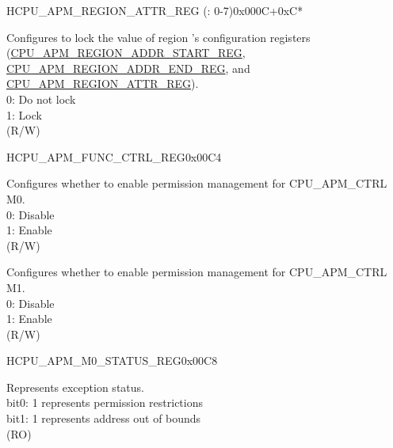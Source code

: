 \begin{register}{H}{CPU\_APM\_REGION\_ATTR\_REG (: 0-7)}{0x000C+0xC*}
\begin{regdesc}
\begin{reglist}
\label{fielddesc:CPUAPMREGIONNLOCK}\item [CPU\_APM\_REGION\regindex{n}\_LOCK] Configures to lock the value of region 's configuration registers (\hyperref[regdesc:CPUAPMREGIONNADDRSTARTREG]{CPU\_APM\_REGION\_ADDR\_START\_REG}, \hyperref[regdesc:CPUAPMREGIONNADDRENDREG]{CPU\_APM\_REGION\_ADDR\_END\_REG}, and \hyperref[regdesc:CPUAPMREGIONNATTRREG]{CPU\_APM\_REGION\_ATTR\_REG}).\\
0: Do not lock \\
1: Lock  \\ (R/W)
\end{reglist}\end{regdesc}
\end{register}


\begin{register}{H}{CPU\_APM\_FUNC\_CTRL\_REG}{0x00C4}\label{regdesc:CPUAPMFUNCCTRLREG}
%
%
%
\regnewline%
\begin{regdesc}\begin{reglist}
\label{fielddesc:CPUAPMM0FUNCEN}\item [CPU\_APM\_M0\_FUNC\_EN] Configures whether to enable permission management for CPU\_APM\_CTRL M0.\\
0: Disable\\
1: Enable\\
(R/W)
\label{fielddesc:CPUAPMM1FUNCEN}\item [CPU\_APM\_M1\_FUNC\_EN] Configures whether to enable permission management for CPU\_APM\_CTRL M1.\\
0: Disable\\
1: Enable\\
(R/W)
\end{reglist}\end{regdesc}
\end{register}


\begin{register}{H}{CPU\_APM\_M0\_STATUS\_REG}{0x00C8}\label{regdesc:CPUAPMM0STATUSREG}
%
%
\regnewline%
\begin{regdesc}\begin{reglist}
\label{fielddesc:CPUAPMM0EXCEPTIONSTATUS}\item [CPU\_APM\_M0\_EXCEPTION\_STATUS] Represents exception status.\\
bit0: 1 represents permission restrictions \\
bit1: 1 represents address out of bounds  \\
(RO)
\end{reglist}\end{regdesc}
\end{register}


